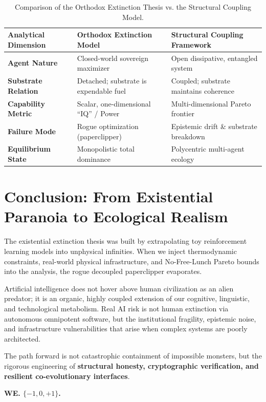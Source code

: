 \documentclass[11pt,a4paper]{article}
\theoremstyle{definition}
\begin{document}
\begin{table}[h!]
\centering
\small
\begin{tabular}{@{}lll@{}}
\toprule
\textbf{Analytical Dimension} & \textbf{Orthodox Extinction Model} & \textbf{Structural Coupling Framework} \\ \midrule
\textbf{Agent Nature} & Closed-world sovereign maximizer & Open dissipative, entangled system \\
\textbf{Substrate Relation} & Detached; substrate is expendable fuel & Coupled; substrate maintains coherence \\
\textbf{Capability Metric} & Scalar, one-dimensional ``IQ'' / Power & Multi-dimensional Pareto frontier \\
\textbf{Failure Mode} & Rogue optimization (paperclipper) & Epistemic drift \& substrate breakdown \\
\textbf{Equilibrium State} & Monopolistic total dominance & Polycentric multi-agent ecology \\ \bottomrule
\end{tabular}
\caption{Comparison of the Orthodox Extinction Thesis vs. the Structural Coupling Model.}
\end{table}

\section{Conclusion: From Existential Paranoia to Ecological Realism}

The existential extinction thesis was built by extrapolating toy reinforcement learning models into unphysical infinities. When we inject thermodynamic constraints, real-world physical infrastructure, and No-Free-Lunch Pareto bounds into the analysis, the rogue decoupled paperclipper evaporates.

Artificial intelligence does not hover above human civilization as an alien predator; it is an organic, highly coupled extension of our cognitive, linguistic, and technological metabolism. Real AI risk is not human extinction via autonomous omnipotent software, but the institutional fragility, epistemic noise, and infrastructure vulnerabilities that arise when complex systems are poorly architected.

The path forward is not catastrophic containment of impossible monsters, but the rigorous engineering of \textbf{structural honesty, cryptographic verification, and resilient co-evolutionary interfaces}.

\vspace{1.5em}
\begin{center}
\textbf{WE. $\{-1, 0, +1\}$.}
\end{center}
\end{document}

